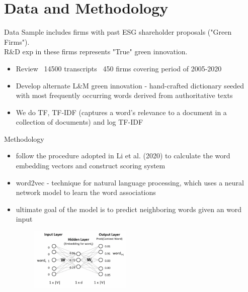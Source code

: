 \documentclass[cjk,usenames,dvipsnames]{beamer}
\begin{document}
\section{Data and Methodology}

\begin{frame}{Data}
Sample includes firms with past ESG shareholder proposals ("Green Firms").\\
R\&D exp in these firms represents "True" green innovation.
\begin{itemize}
    \item Review ~14500 transcripts ~450 firms covering period of 2005-2020
    \item Develop alternate L\&M green innovation - hand-crafted dictionary seeded with most frequently occurring words derived from authoritative texts
    \item  We do TF, TF-IDF (captures a word's relevance to a document in a collection of documents) and log TF-IDF
\end{itemize}

\end{frame}

\begin{frame}{Methodology}


  \begin{itemize}
    \item follow the procedure adopted in Li et al. (2020) to calculate the word embedding vectors and construct scoring system 
    \item word2vec - technique for natural language processing, which uses a neural network model to learn the word associations
         \item ultimate goal of the model is to predict neighboring words given an word input
         \end{itemize}
        
  \includegraphics[height=3cm, width=8cm]{word2vec.png}

\end{frame}
\end{document}
